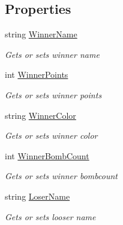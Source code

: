 \subsection*{Properties}
\begin{DoxyCompactItemize}
\item 
string \mbox{\hyperlink{class_bomberman_1_1_business_logic_1_1_logic_classes_1_1_game_finished_event_args_ae7bbb9f0fa799e239a73a1f081ad5ced}{Winner\+Name}}
\begin{DoxyCompactList}\small\item\em Gets or sets winner name \end{DoxyCompactList}\item 
int \mbox{\hyperlink{class_bomberman_1_1_business_logic_1_1_logic_classes_1_1_game_finished_event_args_a3ff0d9a7086bc386b02a204b83f7e926}{Winner\+Points}}
\begin{DoxyCompactList}\small\item\em Gets or sets winner points \end{DoxyCompactList}\item 
string \mbox{\hyperlink{class_bomberman_1_1_business_logic_1_1_logic_classes_1_1_game_finished_event_args_a112368e626ff4965512421d0501af4bd}{Winner\+Color}}
\begin{DoxyCompactList}\small\item\em Gets or sets winner color \end{DoxyCompactList}\item 
int \mbox{\hyperlink{class_bomberman_1_1_business_logic_1_1_logic_classes_1_1_game_finished_event_args_a64a9f814e9732e039ab0981f2dd2f965}{Winner\+Bomb\+Count}}
\begin{DoxyCompactList}\small\item\em Gets or sets winner bombcount \end{DoxyCompactList}\item 
string \mbox{\hyperlink{class_bomberman_1_1_business_logic_1_1_logic_classes_1_1_game_finished_event_args_aabf0c994c2308a7ff449eae7c7d05be4}{Loser\+Name}}
\begin{DoxyCompactList}\small\item\em Gets or sets looser name \end{DoxyCompactList}\item 

\end{DoxyCompactItemize}
